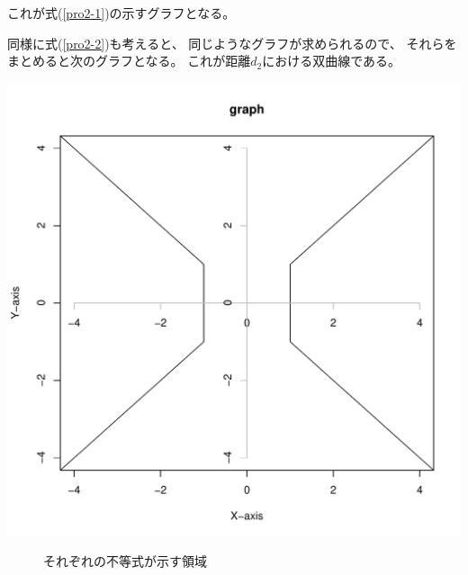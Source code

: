 \documentclass[12pt,b5paper]{ltjsarticle}
\begin{document}
\begin{enumerate}
      これが式(\ref{pro2-1})の示すグラフとなる。

      同様に式(\ref{pro2-2})も考えると、
      同じようなグラフが求められるので、
      それらをまとめると次のグラフとなる。
      これが距離$d_2$における双曲線である。
      \begin{center}
       \includegraphics[scale=0.5]{graph_all.pdf}
      \end{center}


      \begin{figure}[h]
       それぞれの不等式が示す領域


\end{figure}
\end{enumerate}
\end{document}
